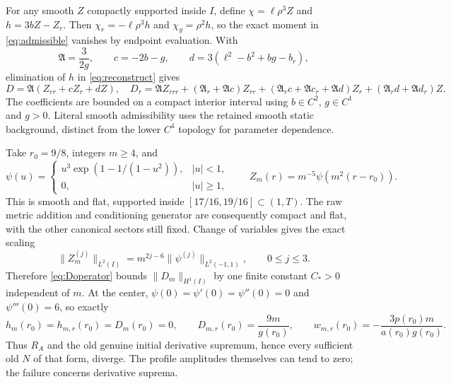 \documentclass[11pt]{article}
\newcommand{\norm}[1]{\lVert #1\rVert}
\begin{document}
For any smooth $Z$ compactly supported inside $I$, define
$\chi=\ell\rho^3Z$ and $h=3bZ-Z_r$. Then
$\chi_r=-\ell\rho^3h$ and $\chi_y=\rho^2h$, so the exact moment in
\eqref{eq:admissible} vanishes by endpoint evaluation. With
\begin{equation}
 \mathfrak A=\frac3{2g},\qquad c=-2b-g,\qquad
 d=3(\ell^2-b^2+bg-b_r),
 \label{eq:profileoperator}
\end{equation}
elimination of $h$ in \eqref{eq:reconstruct} gives
\begin{equation}
 D=\mathfrak A(Z_{rr}+cZ_r+dZ),\quad
 D_r=\mathfrak A Z_{rrr}+(\mathfrak A_r+\mathfrak Ac)Z_{rr}
       +(\mathfrak A_rc+\mathfrak Ac_r+\mathfrak Ad)Z_r
       +(\mathfrak A_rd+\mathfrak Ad_r)Z.
 \label{eq:Doperator}
\end{equation}
The coefficients are bounded on a compact interior interval using
$b\in C^2$, $g\in C^1$ and $g>0$. Literal smooth admissibility uses the
retained smooth static background, distinct from the lower $C^4$
topology for parameter dependence.

Take $r_0=9/8$, integers $m\ge4$, and
\begin{equation}
 \psi(u)=
 \begin{cases}u^3\exp(1-1/(1-u^2)),&|u|<1,\\0,&|u|\ge1,\end{cases}
 \qquad Z_m(r)=m^{-5}\psi(m^2(r-r_0)).
 \label{eq:concentration}
\end{equation}
This is smooth and flat, supported inside
$[17/16,19/16]\subset(1,T)$. The raw metric addition and conditioning
generator are consequently compact and flat, with the other canonical
sectors still fixed. Change of variables gives the exact scaling
\begin{equation}
 \norm{Z_m^{(j)}}_{L^2(I)}
       =m^{2j-6}\norm{\psi^{(j)}}_{L^2(-1,1)},\qquad 0\le j\le3.
 \label{eq:scaling}
\end{equation}
Therefore \eqref{eq:Doperator} bounds $\norm{D_m}_{H^1(I)}$ by one
finite constant $C_*>0$ independent of $m$.
At the center,
$\psi(0)=\psi'(0)=\psi''(0)=0$ and $\psi'''(0)=6$, so exactly
\begin{equation}
 h_m(r_0)=h_{m,r}(r_0)=D_m(r_0)=0,\qquad
 D_{m,r}(r_0)=\frac{9m}{g(r_0)},\qquad
 w_{m,r}(r_0)=-\frac{3p(r_0)m}{a(r_0)g(r_0)}.
 \label{eq:center}
\end{equation}
Thus $R_A$ and the old genuine initial derivative supremum, hence every
sufficient old $N$ of that form, diverge. The profile amplitudes themselves
can tend to zero; the failure concerns derivative suprema.
\end{document}
